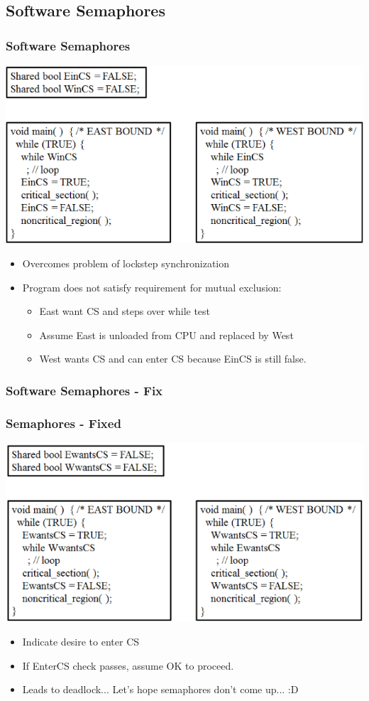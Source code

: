 \documentclass{beamer}
\begin{document}
\subsection{Software Semaphores}
\begin{frame}
\frametitle{Software Semaphores}
\includegraphics[scale=0.35]{sem1.png}
\begin{itemize}
\item Overcomes problem of lockstep synchronization
\item Program does not satisfy requirement for mutual exclusion:
\begin{itemize}
\item East want CS and steps over while test
\item Assume East is unloaded from CPU and replaced by West
\item West wants CS and can enter CS because EinCS is still false.
\end{itemize}
\end{itemize}
\end{frame}
\subsubsection{Software Semaphores - Fix}
\begin{frame}
\frametitle{Semaphores - Fixed}
\includegraphics[scale=0.35]{sem2.png}
\begin{itemize}
\item Indicate desire to enter CS
\item If EnterCS check passes, assume OK to proceed.
\item Leads to deadlock... Let's hope semaphores don't come up... :D 
\end{itemize}
\end{frame}
\end{document}

